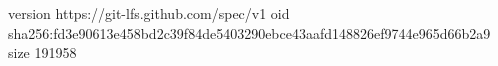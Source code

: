 version https://git-lfs.github.com/spec/v1
oid sha256:fd3e90613e458bd2c39f84de5403290ebce43aafd148826ef9744e965d66b2a9
size 191958
